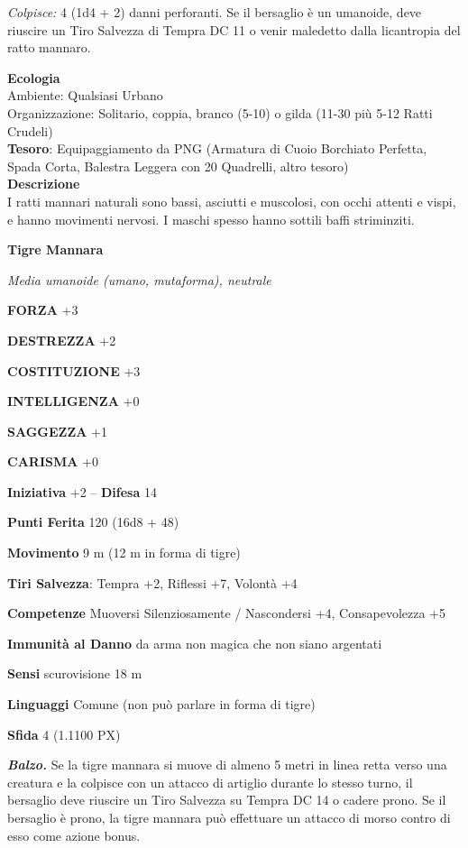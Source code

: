 \begin{multicols}{2}
\textit{Colpisce:} 4 (1d4 + 2) danni perforanti. Se il bersaglio è un umanoide, deve riuscire un Tiro Salvezza di Tempra DC 11 o venir maledetto dalla licantropia del ratto mannaro.

\textbf{Ecologia}\\
Ambiente: Qualsiasi Urbano\\
Organizzazione: Solitario, coppia, branco (5-10) o gilda (11-30 più 5-12 Ratti Crudeli)\\
\textbf{Tesoro}: Equipaggiamento da PNG (Armatura di Cuoio Borchiato Perfetta, Spada Corta, Balestra Leggera con 20 Quadrelli, altro tesoro)\\
\textbf{Descrizione}\\
I ratti mannari naturali sono bassi, asciutti e muscolosi, con occhi attenti e vispi, e hanno movimenti nervosi. I maschi spesso hanno sottili baffi striminziti.

\medskip{}\textbf{Tigre Mannara}

\textit{Media umanoide (umano, mutaforma), neutrale}

\textbf{FORZA} +3

\textbf{DESTREZZA} +2

\textbf{COSTITUZIONE} +3

\textbf{INTELLIGENZA} +0

\textbf{SAGGEZZA} +1

\textbf{CARISMA} +0

\textbf{Iniziativa} +2 -- \textbf{Difesa} 14

\textbf{Punti Ferita} 120 (16d8 + 48)

\textbf{Movimento} 9 m (12 m in forma di tigre)

\textbf{Tiri Salvezza}: Tempra +2, Riflessi +7, Volontà +4

\textbf{Competenze} Muoversi Silenziosamente / Nascondersi +4, Consapevolezza +5

\textbf{Immunità al Danno} da arma non magica che non siano argentati

\textbf{Sensi} scurovisione 18 m

\textbf{Linguaggi} Comune (non può parlare in forma di tigre)

\textbf{Sfida} 4 (1.1100 PX)

\textit{\textbf{Balzo.}} Se la tigre mannara si muove di almeno 5 metri in linea retta verso una creatura e la colpisce con un attacco di artiglio durante lo stesso turno, il bersaglio deve riuscire un Tiro Salvezza su Tempra DC 14 o cadere prono. Se il bersaglio è prono, la tigre mannara può effettuare un attacco di morso contro di esso come azione bonus.


\end{multicols}
